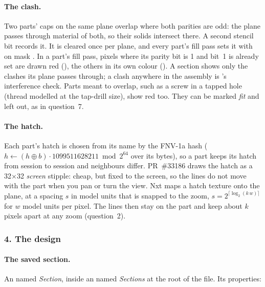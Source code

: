 \paragraph{The clash.} Two parts' caps on the same plane overlap where both parities are odd: the plane passes through
material of both, so their solids intersect there. A second stencil bit records it. It is cleared once per plane, and
every part's fill pass sets it with  on mask . In a part's fill pass,
pixels where its parity bit is 1 and bit~1 is already set are drawn red (), the
others in its own colour (). A section shows only the clashes its plane passes through; a clash
anywhere in the assembly is 's interference check. Parts meant to overlap, such as a screw in a tapped
hole (thread modelled at the tap-drill size), show red too. They can be marked \emph{fit} and left out, as in
question~7.

\paragraph{The hatch.} Each part's hatch is chosen from its name by the FNV-1a hash ($h \leftarrow (h\oplus b)\cdot
1099511628211 \bmod 2^{64}$ over its bytes), so a part keeps its hatch from session to session and neighbours differ.
PR~\#33186 draws the hatch as a 32$\times$32 \emph{screen} stipple: cheap, but fixed to the screen, so the lines do
not move with the part when you pan or turn the view. Nxt maps a hatch texture onto the plane, at a spacing $s$ in
model units that is snapped to the zoom, $s = 2^{\lceil\log_2(k\,w)\rceil}$ for $w$ model units per pixel. The lines
then stay on the part and keep about $k$ pixels apart at any zoom (question~2).

\subsubsection*{4. The design}

\paragraph{The saved section.} An  named \emph{Section}, inside an
 named \emph{Sections} at the root of the file. Its properties:

